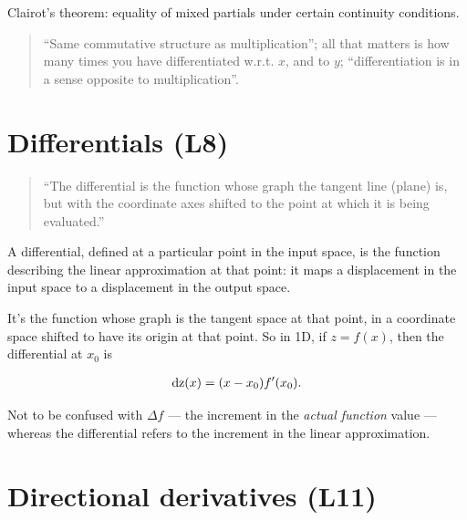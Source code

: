 \documentclass[12pt]{article}
\begin{document}
Clairot's theorem: equality of mixed partials under certain continuity
conditions.

\begin{quote}
``Same commutative structure as multiplication''; all that matters
is how many times you have differentiated w.r.t. $x$, and to $y$;
``differentiation is in a sense opposite to multiplication''.
\end{quote}

\section{Differentials (L8)}

\begin{quote}
  ``The differential is the function whose graph the tangent line (plane) is,
  but with the coordinate axes shifted to the point at which it is being
  evaluated.''
\end{quote}

A differential, defined at a particular point in the input space, is the
function describing the linear approximation at that point: it maps a
displacement in the input space to a displacement in the output space.

It's the function whose graph is the tangent space at that point, in a
coordinate space shifted to have its origin at that point. So in 1D, if
$z = f(x)$, then the differential at $x_0$ is

\begin{align*}
  \operatorname{\text{dz}}(x) = (x - x_0)f'(x_0).
\end{align*}


Not to be confused with $\Delta f$ --- the increment in the \textit{actual
  function} value --- whereas the differential refers to the increment in the
linear approximation.


\section{Directional derivatives (L11)}


\end{document}

